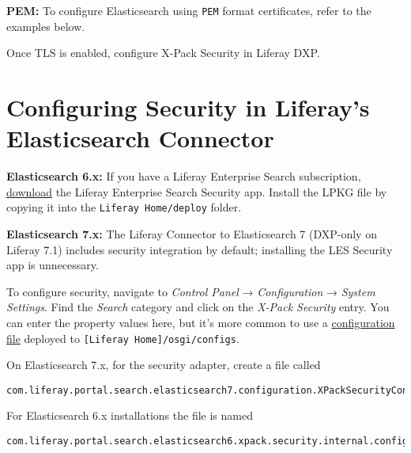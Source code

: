 \noindent\hrulefill

\textbf{PEM:} To configure Elasticsearch using \texttt{PEM} format
certificates, refer to the examples below.

\noindent\hrulefill

Once TLS is enabled, configure X-Pack Security in Liferay DXP.

\section{Configuring Security in Liferay's Elasticsearch
Connector}\label{configuring-security-in-liferays-elasticsearch-connector}

\noindent\hrulefill

\textbf{Elasticsearch 6.x:} If you have a Liferay Enterprise Search
subscription,
\href{https://web.liferay.com/group/customer/dxp/downloads/enterprise-search}{download}
the Liferay Enterprise Search Security app. Install the LPKG file by
copying it into the \texttt{Liferay\ Home/deploy} folder.

\noindent\hrulefill

\noindent\hrulefill

\textbf{Elasticsearch 7.x:} The Liferay Connector to Elasticsearch 7
(DXP-only on Liferay 7.1) includes security integration by default;
installing the LES Security app is unnecessary.

\noindent\hrulefill

To configure security, navigate to \emph{Control Panel} →
\emph{Configuration} → \emph{System Settings}. Find the \emph{Search}
category and click on the \emph{X-Pack Security} entry. You can enter
the property values here, but it's more common to use a
\href{/docs/7-1/user/-/knowledge_base/u/understanding-system-configuration-files}{configuration
file} deployed to \texttt{{[}Liferay\ Home{]}/osgi/configs}.

On Elasticsearch 7.x, for the security adapter, create a file called

\begin{verbatim}
com.liferay.portal.search.elasticsearch7.configuration.XPackSecurityConfiguration.config
\end{verbatim}

For Elasticsearch 6.x installations the file is named

\begin{verbatim}
com.liferay.portal.search.elasticsearch6.xpack.security.internal.configuration.XPackSecurityConfiguration.config
\end{verbatim}

